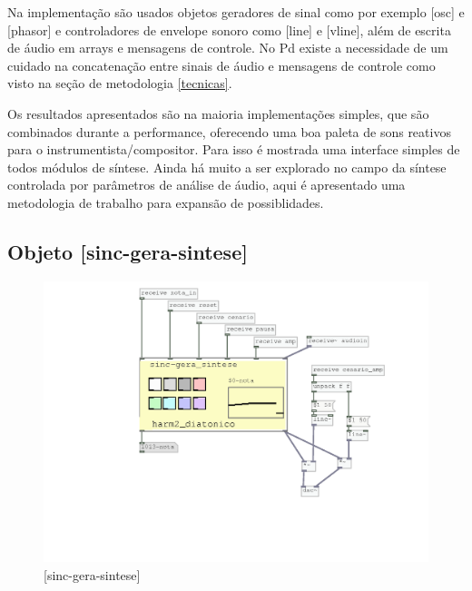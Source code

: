 \documentclass[draft]{ppgmus}
\begin{document}
Na implementação são usados objetos geradores de sinal como
por exemplo [osc\texttildelow] e [phasor\texttildelow] e
controladores de envelope sonoro como [line\texttildelow] e
[vline\texttildelow], além de escrita de áudio em arrays e 
mensagens de controle.
No Pd existe a necessidade de um cuidado na concatenação entre
sinais de áudio e mensagens de controle como visto na seção de metodologia \ref{tecnicas}.




Os resultados apresentados são na maioria implementações simples,
que são combinados durante a performance, oferecendo uma boa paleta
de sons reativos para o instrumentista/compositor. Para isso é
mostrada uma interface simples de todos módulos de síntese.
Ainda há muito a ser explorado no campo da síntese controlada
por parâmetros de análise de áudio, aqui é apresentado uma
metodologia de trabalho para expansão de possiblidades.











% 
% 



\subsection{ Objeto [sinc-gera-sintese]}


\begin{figure}
\includegraphics[scale=.6]{sinc-gera-sintese}
\caption{[sinc-gera-sintese]}
\label{sincgerasintese}
\end{figure}
\end{document}

